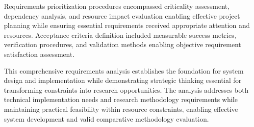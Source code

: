 Requirements prioritization procedures encompassed criticality assessment, dependency analysis, and resource impact evaluation enabling effective project planning while ensuring essential requirements received appropriate attention and resources. Acceptance criteria definition included measurable success metrics, verification procedures, and validation methods enabling objective requirement satisfaction assessment.

This comprehensive requirements analysis establishes the foundation for system design and implementation while demonstrating strategic thinking essential for transforming constraints into research opportunities. The analysis addresses both technical implementation needs and research methodology requirements while maintaining practical feasibility within resource constraints, enabling effective system development and valid comparative methodology evaluation.